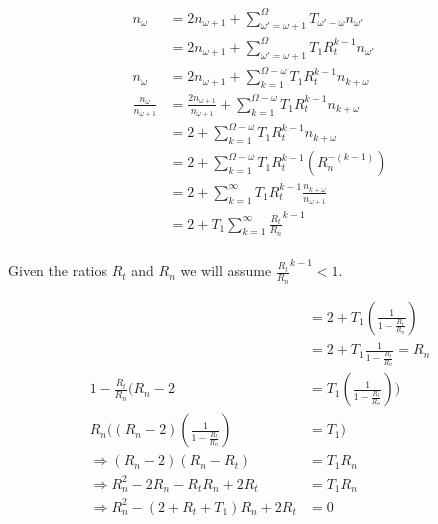 \begin{enumerate}
    \begin{align}
    n_\omega &=
        2n_{\omega+1} +
        \sum^
            {\Omega}_
            {\omega\mathsf{'}=\omega+1}{
            T_{\omega\mathsf{'}-\omega}
            n_{\omega\mathsf{'}
            }}
        \\
    &=
        2n_{\omega+1} +
        \sum^
        {\Omega}_
        {\omega\mathsf{'}=\omega+1}{
            T_{1}
            R_{t}^{k-1}
            n_{\omega\mathsf{'}}
        }\\
    n_{\omega} &=
        2n_{\omega+1} +
        \sum^
        {\Omega-\omega}_
        {k=1}{
            T_{1}
            R_{t}^{k-1}
            n_{k+\omega}
        }\\
    \frac{n_{\omega}}{n_{\omega+1}} &=
        \frac{
            2n_{\omega+1}
            }{
            n_{\omega+1}
            } +
        \sum^
        {\Omega-\omega}_
        {k=1}{
            T_{1}
            R_{t}^{k-1}
            n_{k+\omega}
        }\\
    &= 2 +
        \sum^
        {\Omega-\omega}_
        {k=1}{
            T_{1}
            R_{t}^{k-1}
            n_{k+\omega}
        }\\
    &= 2 +
        \sum^
        {\Omega-\omega}_
        {k=1}{
            T_{1}
            R_{t}^{k-1}
            \left(
            R_{n}^{-(k-1)}
            \right)
        }\\
    &= 2 +
        \sum^
        {\infty}_
        {k=1}{
            T_{1}
            R_{t}^{k-1}
            \frac{
            n_{k+\omega}}
            {n_{\omega+1}}
        }\\
    &= 2 + T_{1}
        \sum^
        {\infty}_
        {k=1}{
            \frac{
            R_{t}}{
            R_{n}}^{k-1}
        }\\
    \end{align}

Given the ratios $R_t$ and $R_n$ we will assume $\frac{R_{t}}{R_{n}}^{k-1} < 1$.

    \begin{align}
    &= 2 + T_{1}
    \left(
        \frac
        {1}
        {1 - \frac{R_{t}} {R_{n}}}
    \right)\\
    &= 2 + T_{1}
    \frac
    {1}
    {1 - \frac{R_{t}} {R_{n}}} = R_n\\
    1 - \frac{R_{t}} {R_{n}}
    \Bigg(
        R_n - 2 &= T_1
            \left(
            \frac
            {1}
            {1 - \frac{R_{t}} {R_{n}}}
            \right)
    \Bigg)\\
    R_{n}
    \Bigg(
        (R_n - 2)
        \left(
            \frac{1}
            {1-\frac{R_{t}}{R_{n}}}
        \right) &= T_1
    \Bigg)\\
    \Rightarrow
    (R_n - 2)
    (R_n - R_t)
    &= T_1 R_n\\
    \Rightarrow
    R_{n}^{2}
    - 2R_n
    - R_t R_n
    + 2R_t
    &= T_1 R_n\\
    \Rightarrow
    R_{n}^{2} - 
    \left(
    2 + R_t + T_1
    \right)
    R_n + 2R_t
    &= 0
    \end{align}
    

\end{enumerate}
